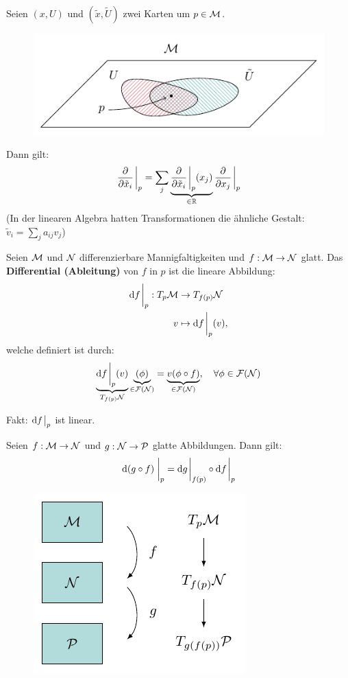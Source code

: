 \begin{satz}[Transformationsregel]
Seien $(x, U)$ und $(\tilde{x}, \tilde{U})$ zwei Karten um $p \in \mathcal{M}$.
\begin{figure}[H]
\centering
\includegraphics[scale=1.0]{figures/tikz/transformationlaw.pdf}
\label{img:transformationsregel}
\end{figure}  
Dann gilt:
\begin{align}
\pdv{\tilde{x}_i} \eval_p  = \sum_j \underbrace{\pdv{\tilde{x}_i} \eval_p  (x_j)}_{\in \R} \pdv{x_j} \eval_p 
\end{align}
(In der linearen Algebra hatten Transformationen die ähnliche Gestalt: $\tilde{v}_i = \sum_j a_{i j } v_j$)
\end{satz}
\begin{defs}
Seien $\mathcal{M}$ und $\mathcal{N}$ differenzierbare Mannigfaltigkeiten und $f: \mathcal{M} \to \mathcal{N}$ glatt.
Das \textbf{Differential (Ableitung)} von $f$ in $p$ ist die lineare Abbildung:
\begin{align}
\dd f \eval_p : \tspace{p} &\to T_{f(p)}\mfka \\
v &\mapsto \dd f \eval_p (v),
\end{align}
welche definiert ist durch:
\begin{align}
\underbrace{\dd f \eval_p (v)}_{T_{f(p)}\mfka} \underbrace{(\phi)}_{\in \mathcal{F}(\mfka)} = \underbrace{v(\phi \circ f)}_{\in \mathcal{F}(\mfka)}, \quad \forall \phi \in \mathcal{F}(\mfka)
\end{align}
\end{defs}
Fakt: $\dd f \eval_p$ ist linear.
\begin{satz}[Kettenregel]
\label{satz:Kettenregel}
Seien $f: \mathcal{M} \to \mathcal{N}$ und $g: \mathcal{N} \to \mathcal{P}$ glatte Abbildungen.
Dann gilt:
\begin{align}
\dd (g \circ f) \eval_p = \dd g \eval_{f(p)} \circ \dd f \eval_p
\end{align}
\begin{figure}[H]
\centering
\includegraphics[width=0.45\linewidth]{figures/tikz/chain_rule.pdf}
\label{img:kettenregel}
\end{figure} 
\end{satz}

